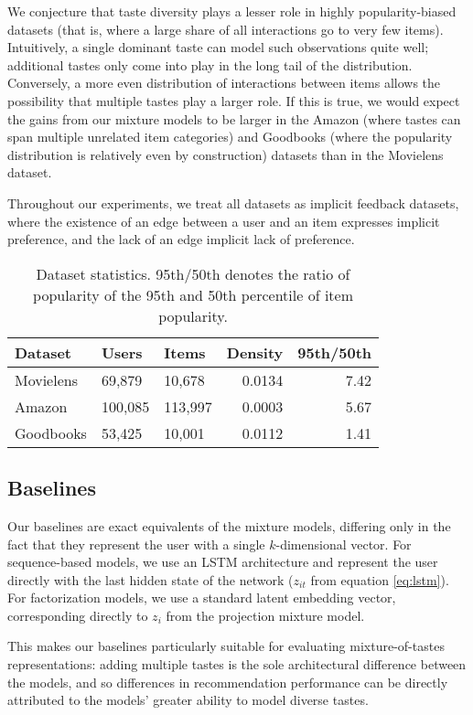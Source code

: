 \documentclass[sigconf]{acmart}
\begin{document}
We conjecture that taste diversity plays a lesser role in highly popularity-biased datasets (that is, where a large share of all interactions go to very few items). Intuitively, a single dominant taste can model such observations quite well; additional tastes only come into play in the long tail of the distribution. Conversely, a more even distribution of interactions between items allows the possibility that multiple tastes play a larger role. If this is true, we would expect the gains from our mixture models to be larger in the Amazon (where tastes can span multiple unrelated item categories) and Goodbooks (where the popularity distribution is relatively even by construction) datasets than in the Movielens dataset.

Throughout our experiments, we treat all datasets as implicit feedback datasets, where the existence of an edge between a user and an item expresses implicit preference, and the lack of an edge implicit lack of preference.

\begin{table}
  \caption{Dataset statistics. 95th/50th denotes the ratio of popularity of the 95th and 50th percentile of item popularity.}
  \label{tab:datasets}
\begin{tabularx}{\columnwidth}{lllrr}
\toprule
 Dataset       & Users   & Items   &   Density &   95th/50th \\
\midrule
 Movielens & 69,879  & 10,678  &    0.0134 &      7.42 \\
 Amazon        & 100,085 & 113,997 &    0.0003 &      5.67 \\
 Goodbooks     & 53,425  & 10,001  &    0.0112 &      1.41 \\
\bottomrule
\end{tabularx}
\end{table}

\subsection{Baselines}
Our baselines are exact equivalents of the mixture models, differing only in the fact that they represent the user with a single $k$-dimensional vector. For sequence-based models, we use an LSTM architecture and represent the user directly with the last hidden state of the network ($z_{it}$ from equation \ref{eq:lstm}). For factorization models, we use a standard latent embedding vector, corresponding directly to $z_i$ from the projection mixture model.

This makes our baselines particularly suitable for evaluating mixture-of-tastes representations: adding multiple tastes is the sole architectural difference between the models, and so differences in recommendation performance can be directly attributed to the models' greater ability to model diverse tastes.
\end{document}
